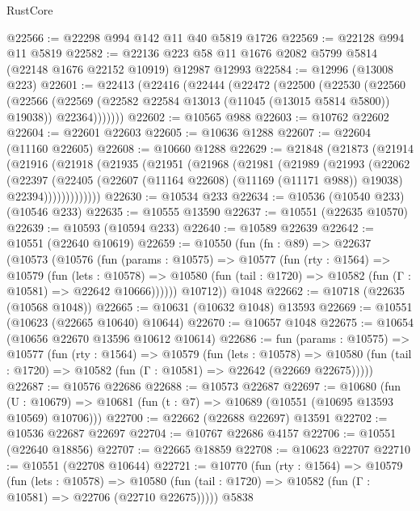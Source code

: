 \begin{lexlean}{RustCore}
\begin{coremodule}
@22566 := @22298 @994 @142 @11 @40 @5819 @1726
@22569 := @22128 @994 @11 @5819
@22582 := @22136 @223 @58 @11 @1676 @2082 @5799 @5814 (@22148 @1676 @22152 @10919) @12987 @12993
@22584 := @12996 (@13008 @223)
@22601 := @22413
    (@22416
      (@22444
        (@22472
          (@22500
            (@22530
              (@22560
                (@22566
                  (@22569 (@22582 @22584 @13013 (@11045 (@13015 @5814 @5800)) @19038))
                  @22364)))))))
@22602 := @10565 @988
@22603 := @10762 @22602
@22604 := @22601 @22603
@22605 := @10636 @1288
@22607 := @22604 (@11160 @22605)
@22608 := @10660 @1288
@22629 := @21848
    (@21873
      (@21914
        (@21916
          (@21918
            (@21935
              (@21951
                (@21968
                  (@21981
                    (@21989
                      (@21993
                        (@22062
                          (@22397
                            (@22405
                              (@22607 (@11164 @22608) (@11169 (@11171 @988)) @19038)
                              @22394)))))))))))))
@22630 := @10534 @233
@22634 := @10536 (@10540 @233) (@10546 @233)
@22635 := @10555 @13590
@22637 := @10551 (@22635 @10570)
@22639 := @10593 (@10594 @233)
@22640 := @10589 @22639
@22642 := @10551 (@22640 @10619)
@22659 := @10550
    (fun (fn : @89) =>
    @22637
      (@10573
        (@10576
          (fun (params : @10575) =>
          @10577
            (fun (rty : @1564) =>
            @10579
              (fun (lets : @10578) =>
              @10580 (fun (tail : @1720) => @10582 (fun (Γ : @10581) => @22642 @10666))))))
        @10712))
    @1048
@22662 := @10718 (@22635 (@10568 @1048))
@22665 := @10631 (@10632 @1048) @13593
@22669 := @10551 (@10623 (@22665 @10640) @10644)
@22670 := @10657 @1048
@22675 := @10654 (@10656 @22670 @13596 @10612 @10614)
@22686 := fun (params : @10575) =>
  @10577
    (fun (rty : @1564) =>
    @10579
      (fun (lets : @10578) =>
      @10580 (fun (tail : @1720) => @10582 (fun (Γ : @10581) => @22642 (@22669 @22675)))))
@22687 := @10576 @22686
@22688 := @10573 @22687
@22697 := @10680
    (fun (U : @10679) => @10681 (fun (t : @7) => @10689 (@10551 (@10695 @13593 @10569) @10706)))
@22700 := @22662 (@22688 @22697) @13591
@22702 := @10536 @22687 @22697
@22704 := @10767 @22686 @4157
@22706 := @10551 (@22640 @18856)
@22707 := @22665 @18859
@22708 := @10623 @22707
@22710 := @10551 (@22708 @10644)
@22721 := @10770
    (fun (rty : @1564) =>
    @10579
      (fun (lets : @10578) =>
      @10580 (fun (tail : @1720) => @10582 (fun (Γ : @10581) => @22706 (@22710 @22675)))))
    @5838

\end{coremodule}
\end{lexlean}
